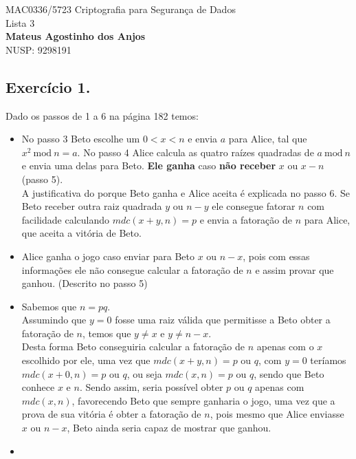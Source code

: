 \documentclass[12pt]{article}
\newcommand{\modd}{\ \text{mod}\ }
\begin{document}
	\begin{center}
		{\Large MAC0336/5723 Criptografia para Segurança de Dados\\
		Lista 3}\\
		\textbf{Mateus Agostinho dos Anjos}\\
		NUSP: 9298191
	\end{center}

	\vspace{0.4 cm}
	
	\subsection*{Exercício 1.}
		Dado os passos de 1 a 6 na página 182 temos:
		\begin{itemize}			
			\item[1 -]
				No passo 3 Beto escolhe um $0 < x < n$ e envia $a$ para
				Alice, tal que $x^2 \modd n = a$. No passo 4 Alice calcula as 
				quatro raízes quadradas de $a \modd n$ e envia uma delas 
				para Beto. \textbf{Ele ganha} caso \textbf{não receber} $x$ ou 
				$x - n$ (passo 5).\\
				A justificativa do porque Beto ganha e Alice aceita é explicada
				no passo 6. Se Beto receber outra raiz quadrada $y$ ou
				$n - y$ ele consegue fatorar $n$ com facilidade calculando
				$mdc(x+y, n) = p$ e envia a fatoração de $n$ para Alice, que
				aceita a vitória de Beto.
			\item[2 -]
				Alice ganha o jogo caso enviar para Beto $x$ ou $n - x$, pois
				com essas informações ele não consegue calcular a fatoração
				de $n$ e assim provar que ganhou. (Descrito no passo 5)
			\item[3 -]
				Sabemos que $n = pq$.\\		
				Assumindo que $y = 0$ fosse uma raiz válida que permitisse
				a Beto obter a fatoração de $n$, temos que $y \neq x$ e
				$y \neq n - x$.\\
				Desta forma Beto conseguiria calcular a fatoração de $n$ apenas com
				o $x$ escolhido por ele, uma vez que $mdc(x+y, n) = p$ ou $q$, 
				com $y = 0$ teríamos $mdc(x+0, n) = p$ ou $q$, ou
				seja $mdc(x, n) = p$ ou $q$, sendo que Beto conhece $x$ e $n$.
				Sendo assim, seria possível obter $p$ ou $q$ apenas com $mdc(x, n)$,
				favorecendo Beto que sempre ganharia o jogo, uma vez que a prova
				de sua vitória é obter a fatoração de $n$, pois mesmo que Alice 
				enviasse $x$ ou $n-x$, Beto ainda seria capaz de mostrar que ganhou.
			\item[4 -]

\end{itemize}
\end{document}
